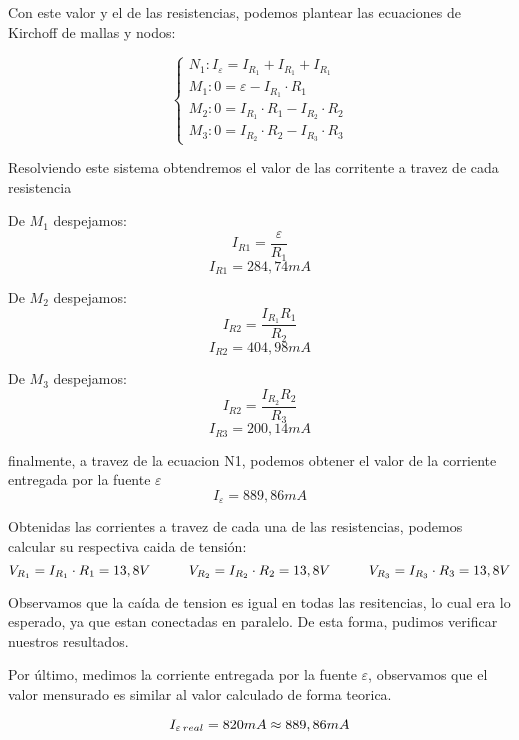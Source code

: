 \documentclass[12pt]{report}
\begin{document}
Con este valor y el de las resistencias, podemos plantear las ecuaciones de Kirchoff de mallas y
nodos:

\[
\begin{cases}
  N_1 : I_{\varepsilon} = I_{R_1} + I_{R_1} + I_{R_1} \\
  M_1 : 0 = \varepsilon - I_{R_1} \cdot R_1 \\
  M_2 : 0 = I_{R_1} \cdot R_1 - I_{R_2} \cdot R_2 \\
  M_3 : 0 = I_{R_2} \cdot R_2 - I_{R_3} \cdot R_3
\end{cases}
\]

Resolviendo este sistema obtendremos el valor de las corritente a travez de cada resistencia

\noindent
\begin{minipage}[t]{0.33\textwidth}
  \centering
  De $M_1$ despejamos:
  $$I_{R1} = \frac{\varepsilon}{R_1}$$
  $$I_{R1} = 284,74 mA $$
\end{minipage}
\begin{minipage}[t]{0.33\textwidth}
  \centering
  De $M_2$ despejamos:
  $$I_{R2} = \frac{I_{R_1}R_1}{R_2} $$
  $$I_{R2} = 404,98 mA $$
\end{minipage}
\begin{minipage}[t]{0.33\textwidth}
  \centering
  De $M_3$ despejamos:
  $$I_{R2} = \frac{I_{R_2}R_2}{R_3} $$
  $$I_{R3} = 200,14 mA $$
\end{minipage}

\vspace{7mm}

finalmente, a travez de la ecuacion N1, podemos obtener el valor de la corriente entregada 
por la fuente $\varepsilon$
$$I_{\varepsilon} = 889,86 mA$$

Obtenidas las corrientes a travez de cada una de las resistencias, podemos calcular su respectiva
caida de tensión:
$$ V_{R_1} = I_{R_1} \cdot R_1 = 13,8V \hspace{10mm} V_{R_2} = I_{R_2} \cdot R_2 = 13,8V 
\hspace{10mm} V_{R_3} = I_{R_3} \cdot R_3 = 13,8V $$

Observamos que la caída de tension es igual en todas las resitencias, lo cual era lo esperado, ya
que estan conectadas en paralelo. De esta forma, pudimos verificar nuestros resultados.

Por último, medimos la corriente entregada por la fuente $\varepsilon$, observamos que el
valor mensurado es similar al valor calculado de forma teorica.

$$ I_{\varepsilon \hspace{0,5mm} real} = 820mA \approx 889,86 mA $$
\end{document}
